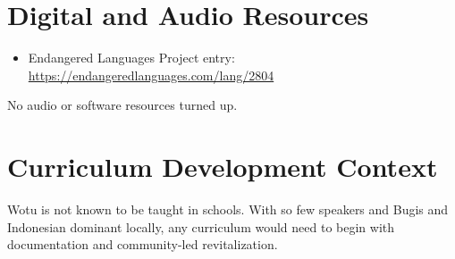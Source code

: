 \documentclass[12pt]{article}
\begin{document}
\section{Digital and Audio Resources}
\begin{itemize}
\item Endangered Languages Project entry: \url{https://endangeredlanguages.com/lang/2804}
\end{itemize}
No audio or software resources turned up.

\section{Curriculum Development Context}
Wotu is not known to be taught in schools. With so few speakers and Bugis and Indonesian dominant locally, any curriculum would need to begin with documentation and community-led revitalization.
\end{document}
